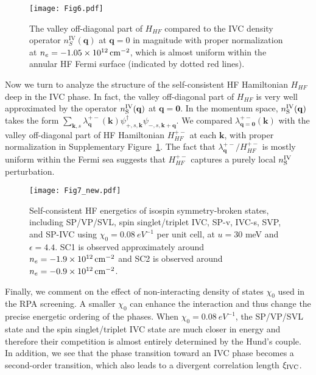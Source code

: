 \documentclass[aps,pra,twocolumn,superscriptaddress,10pt,article,nofootinbib,showpacs,longbibliography]{revtex4-1}
\def \k{{\mathbf k}}
\def \q{{\mathbf q}}
\begin{document}
\begin{figure}[htbp]
    \centering
    \texttt{[image: Fig6.pdf]}
    \caption{The valley off-diagonal part of $H_{HF}$ compared to the IVC density operator $n_S^{\mathrm{IV}}(\q)$ at $\q = 0$ in magnitude with proper normalization at $n_e = \SI{-1.05E12}{cm^{-2}}$, which is almost uniform within the annular HF Fermi surface (indicated by dotted red lines).} 
    \label{fig:HFIVC}
\end{figure}

Now we turn to analyze the structure of the self-consistent HF Hamiltonian $H_{HF}$ deep in the IVC phase. In fact, the valley off-diagonal part of $H_{HF}$ is very well approximated by the operator $n_{\rm S}^{\mathrm{IV}}(\q)$ at $\q = \mathbf{0}$. In the momentum space, $n_{\rm S}^{\mathrm{IV}}(\q)$ takes the form $\sum_{\k,s} \lambda^{+-}_{\q}(\k) \psi^\dagger_{+,s,\k} \psi_{-,s,\k + \q}$. We compared $\lambda^{+-}_{\q = \mathbf{0}}(\k)$ with the valley off-diagonal part of HF Hamiltonian $H^{+-}_{HF}$ at each $\k$, with proper normalization in Supplementary Figure~\ref{fig:HFIVC}. The fact that $\lambda^{+-}_{\q}/H^{+-}_{HF}$ is mostly uniform within the Fermi sea suggests that $H^{+-}_{HF}$ captures a purely local $n_{\rm S}^{\mathrm{IV}}$ perturbation.

\begin{figure}[htbp]
    \centering
    \texttt{[image: Fig7\_new.pdf]}
    \caption{Self-consistent HF energetics of isospin symmetry-broken states, including SP/VP/SVL, spin singlet/triplet IVC, SP-v, IVC-s, SVP, and SP-IVC using $\chi_0 = \SI{0.08}{eV^{-1}}$ per unit cell, at $u = 30$ meV and $\epsilon = 4.4$. SC1 is observed approximately around $n_e = \SI{-1.9E12}{cm^{-2}}$ and SC2 is observed around $n_e = \SI{-0.9E12 }{cm^{-2}}$.}
    \label{fig:HFDOS8}
\end{figure}

Finally, we comment on the effect of non-interacting density of states $\chi_0$ used in the RPA screening. A smaller $\chi_0$ can enhance the interaction and thus change the precise energetic ordering of the phases. When $\chi_0 = \SI{0.08}{eV^{-1}}$, the SP/VP/SVL state and the spin singlet/triplet IVC state are much closer in energy and therefore their competition is almost entirely determined by the Hund's couple. In addition, we see that the phase transition toward an IVC phase becomes a second-order transition, which also leads to a divergent correlation length $\xi_{\rm IVC}$. 
\end{document}

